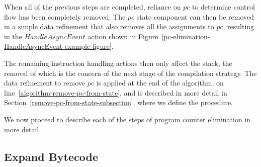 When all of the previous steps are completed, reliance on $pc$ to
determine control flow has been completely removed.
The $pc$ state component can then be removed in a simple data
refinement that also removes all the assignments to $pc$, resulting in
the $HandleAsyncEvent$ action shown in
Figure~\ref{pc-elimination-HandleAsyncEvent-example-figure}.

The remaining instruction handling actions then only affect the stack,
the removal of which is the concern of the next stage of the
compilation strategy.
The data refinement to remove $pc$ is applied at the end of the
algorithm, on line~\ref{algorithm-remove-pc-from-state}, and is
described in more detail in
Section~\ref{remove-pc-from-state-subsection}, where we define the
 procedure.

We now proceed to describe each of the steps of program counter
elimination in more detail.

\FloatBarrier

\subsection{Expand Bytecode}
\label{expand-bytecode-subsection}

